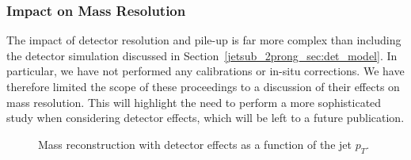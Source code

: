 \documentclass[11pt]{cernrep}
\begin{document}
\subsubsection{Impact on Mass Resolution}\label{jetsub_2prong_sec:detector_robust}

The impact of detector resolution and pile-up is far more complex than
including the detector simulation discussed in
Section~\ref{jetsub_2prong_sec:det_model}.
%
In particular, we have not performed any calibrations or in-situ
corrections.
%
We have therefore limited the scope of these proceedings to a
discussion of their effects on mass resolution.
%
This will highlight the need to perform a more sophisticated study
when considering detector effects, which will be left to a future
publication.

\begin{figure}
  \caption{Mass reconstruction with detector effects as a function of
  the jet $p_T$.}\label{jetsub_2prong_fig:mass-detector}
\end{figure}
\end{document}

